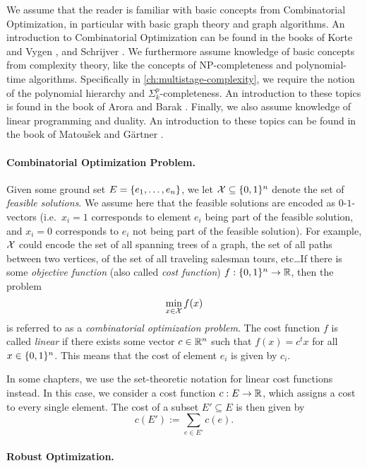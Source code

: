 We assume that the reader is familiar with basic concepts from Combinatorial Optimization, in particular with basic graph theory and graph algorithms. An introduction to Combinatorial Optimization can be found in the books of Korte and Vygen \cite{korte2006combinatorial}, and Schrijver \cite{schrijver2003combinatorial}. We furthermore assume knowledge of basic concepts from complexity theory, like the concepts of NP-completeness and polynomial-time algorithms. Specifically in \cref{ch:multistage-complexity}, we require the notion of the polynomial hierarchy and $\Sigma^p_k$-completeness. An introduction to these topics is found in the book of Arora and Barak \cite{arora2009computational}. Finally, we also assume knowledge of linear programming and duality. An introduction to these topics can be found in the book of Matou{\v{s}}ek and Gärtner \cite{matouvsek2007understanding}.

\paragraph*{Combinatorial Optimization Problem.}
Given some ground set $E = \{ e_1, \ldots, e_n \}$, we let $\mathcal{X} \subseteq \{ 0,1 \}^n$ denote the set of \emph{feasible solutions}. 
We assume here that the feasible solutions are encoded as $0$-$1$-vectors (i.e.\ $x_i = 1$ corresponds to element $e_i$ being part of the feasible solution, and $x_i=0$ corresponds to $e_i$ not being part of the feasible solution). 
For example, $\mathcal{X}$ could encode the set of all spanning trees of a graph, the set of all paths between two vertices, of the set of all traveling salesman tours, etc\dots If there is some \emph{objective function} (also called \emph{cost function}) $f : \{ 0,1 \}^n \to \mathbb{R}$, then the problem
\[
\min_{x \in \mathcal{X}} f(x)
\]
is referred to as a \emph{combinatorial optimization problem}. The cost function $f$ is called \emph{linear} if there exists some vector $c \in \mathbb{R}^n$ such that $f(x) = c^tx$ for all $x \in \{ 0,1 \}^n$. This means that the cost of element $e_i$ is given by $c_i$.

In some chapters, we use the set-theoretic notation for linear cost functions instead. In this case, we consider a cost function $c : E \to \mathbb{R}$, which assigns a cost to every single element. The cost of a subset $E' \subseteq E$ is then given by
\[ c(E') := \sum_{e \in E'}c(e). \]



\paragraph*{Robust Optimization.}

